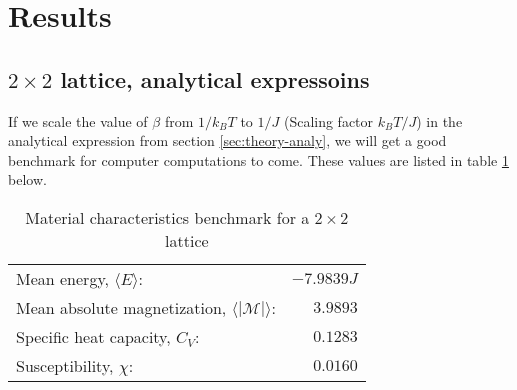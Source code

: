 \documentclass[../main.tex]{subfiles}
\begin{document}
\section{Results}
\subsection{$2 \times 2$ lattice, analytical expressoins}
If we scale the value of $\beta$ from $1/k_BT$ to $1/J$ (Scaling factor $k_B T/J$) in the analytical expression from section \ref{sec:theory-analy}, we will get a good benchmark for computer computations to come. These values are listed in table \ref{tab:2x2spinsEnergiesMags} below.
\begin{table}[!h]
\begin{center}
  \begin{tabular}{l r}
    Mean energy, $\langle E \rangle$: & $-7.9839J$  \\
    Mean absolute magnetization, $\langle |\mathcal{M}| \rangle$: & $3.9893$ \\
    Specific heat capacity, $C_V$: & $0.1283$\\
    Susceptibility, $\chi$: & $0.0160$
  \end{tabular}
  \caption{Material characteristics benchmark for a $2 \times 2$ lattice}
  \label{tab:2x2spinsEnergiesMags}
\end{center}
\end{table}
\FloatBarrier
\end{document}
